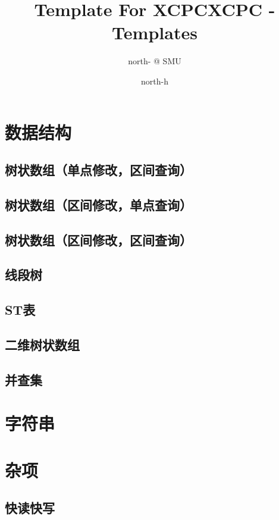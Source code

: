 \documentclass[10pt,a4paper]{article}
\title{Template For XCPC}
\author{north- @ SMU}
\begin{document}
\title{XCPC - Templates}
\author {north-h}
\date{}
\maketitle
\tableofcontents
\newpage
\section{数据结构}
\subsection{树状数组（单点修改，区间查询）}

\subsection{树状数组（区间修改，单点查询）}

\subsection{树状数组（区间修改，区间查询）}

\subsection{线段树}

\subsection{ST表}

\subsection{二维树状数组}

\subsection{并查集}

\section{字符串}
\section{杂项}
\subsection{快读快写}

\end{document}
